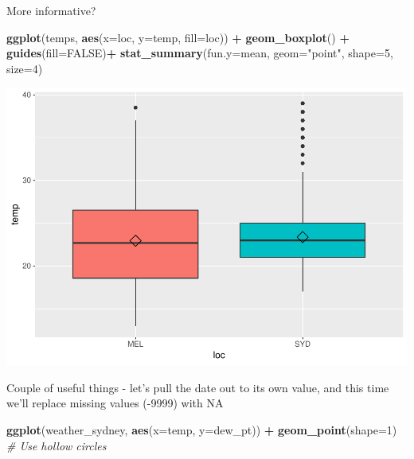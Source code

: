 \documentclass[]{article}
\newenvironment{Shaded}{\begin{snugshade}}{\end{snugshade}}
\newcommand{\CommentTok}[1]{\textcolor[rgb]{0.56,0.35,0.01}{\textit{#1}}}
\newcommand{\DataTypeTok}[1]{\textcolor[rgb]{0.13,0.29,0.53}{#1}}
\newcommand{\DecValTok}[1]{\textcolor[rgb]{0.00,0.00,0.81}{#1}}
\newcommand{\KeywordTok}[1]{\textcolor[rgb]{0.13,0.29,0.53}{\textbf{#1}}}
\newcommand{\NormalTok}[1]{#1}
\newcommand{\OperatorTok}[1]{\textcolor[rgb]{0.81,0.36,0.00}{\textbf{#1}}}
\newcommand{\OtherTok}[1]{\textcolor[rgb]{0.56,0.35,0.01}{#1}}
\newcommand{\StringTok}[1]{\textcolor[rgb]{0.31,0.60,0.02}{#1}}
\begin{document}
More informative?

\begin{Shaded}
\begin{Highlighting}[]
\KeywordTok{ggplot}\NormalTok{(temps, }\KeywordTok{aes}\NormalTok{(}\DataTypeTok{x=}\NormalTok{loc, }\DataTypeTok{y=}\NormalTok{temp, }\DataTypeTok{fill=}\NormalTok{loc)) }\OperatorTok{+}\StringTok{ }\KeywordTok{geom_boxplot}\NormalTok{() }\OperatorTok{+}
\StringTok{    }\KeywordTok{guides}\NormalTok{(}\DataTypeTok{fill=}\OtherTok{FALSE}\NormalTok{)}\OperatorTok{+}
\StringTok{    }\KeywordTok{stat_summary}\NormalTok{(}\DataTypeTok{fun.y=}\NormalTok{mean, }\DataTypeTok{geom=}\StringTok{"point"}\NormalTok{, }\DataTypeTok{shape=}\DecValTok{5}\NormalTok{, }\DataTypeTok{size=}\DecValTok{4}\NormalTok{)}
\end{Highlighting}
\end{Shaded}

\includegraphics{AT2_template__medium__files/figure-latex/unnamed-chunk-6-1.pdf}

Couple of useful things - let's pull the date out to its own value, and
this time we'll replace missing values (-9999) with NA

\begin{Shaded}
\begin{Highlighting}[]
\KeywordTok{ggplot}\NormalTok{(weather_sydney, }\KeywordTok{aes}\NormalTok{(}\DataTypeTok{x=}\NormalTok{temp, }\DataTypeTok{y=}\NormalTok{dew_pt)) }\OperatorTok{+}
\StringTok{    }\KeywordTok{geom_point}\NormalTok{(}\DataTypeTok{shape=}\DecValTok{1}\NormalTok{)      }\CommentTok{# Use hollow circles}
\end{Highlighting}
\end{Shaded}
\end{document}
